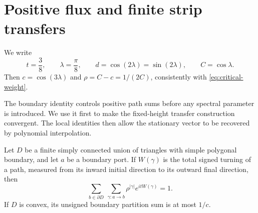 \section{Positive flux and finite strip transfers}\label{sec:flux}

We write
\begin{equation}\label{eq:01-constants}
 t=\frac38,\qquad \lambda=\frac\pi8,\qquad
 d=\cos(2\lambda)=\sin(2\lambda),\qquad C=\cos\lambda.
\end{equation}
Then $c=\cos(3\lambda)$ and $\rho=C-c=1/(2C)$, consistently
with \eqref{eq:critical-weight}.

The boundary identity controls positive path sums before any spectral parameter is introduced. We use it first to make the fixed-height transfer construction convergent. The local identities then allow the stationary vector to be recovered by polynomial interpolation.


\begin{lemma}\label{lem:boundary-flux}
Let $D$ be a finite simply connected union of triangles with simple
polygonal boundary, and let $a$ be a boundary port. If $W(\gamma)$ is
the total signed turning of a path, measured from its inward initial
direction to its outward final direction, then
\begin{equation}\label{eq:01-boundary-identity}
 \sum_{b\in\partial D}\ \sum_{\gamma:a\to b}
       \rho^{|\gamma|}e^{itW(\gamma)}=1.
\end{equation}
If $D$ is convex, its unsigned boundary partition sum is at most $1/c$.
\end{lemma}

